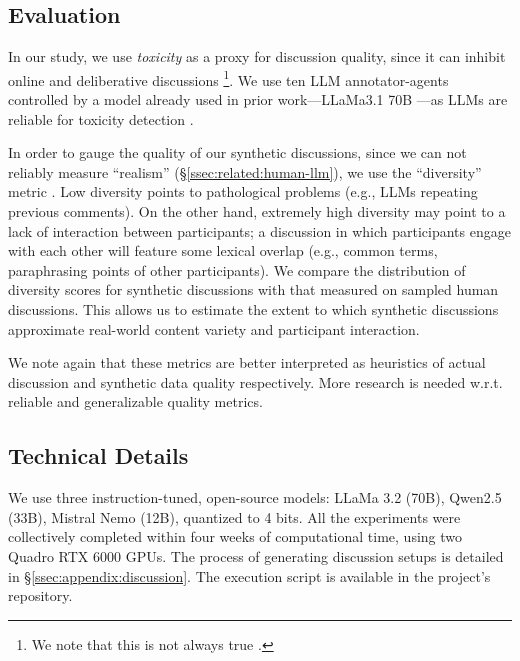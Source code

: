 \subsection{Evaluation}
\label{ssec:experimental:evaluation}

In our study, we use \emph{toxicity} as a proxy for discussion quality, since it can inhibit online and deliberative discussions \citep{dekock2022disagree, XiaToxicity}\footnote{We note that this is not always true \citep{Avalle2024PersistentIP}.}. We use ten LLM annotator-agents controlled by a model already used in prior work---LLaMa3.1 70B \citep{kang-qian-2024-implanting}---as LLMs are reliable for toxicity detection \citep{kang-qian-2024-implanting, Wang2022ToxicityDW, anjum2024hate}.

In order to gauge the quality of our synthetic discussions, since we can not reliably measure ``realism'' (\S\ref{ssec:related:human-llm}), we use the ``diversity'' metric \citep{ulmer2024}. Low diversity points to pathological problems (e.g., LLMs repeating previous comments). On the other hand, extremely high diversity may point to a lack of interaction between participants; a discussion in which participants engage with each other will feature some lexical overlap (e.g., common terms, paraphrasing points of other participants). We compare the distribution of diversity scores for synthetic discussions with that measured on sampled human discussions. This allows us to estimate the extent to which synthetic discussions approximate real-world content variety and participant interaction. 

We note again that these metrics are better interpreted as heuristics of actual discussion and synthetic data quality respectively. More research is needed w.r.t. reliable and generalizable quality metrics.


\subsection{Technical Details}
\label{ssec:experimental:setup}

We use three instruction-tuned, open-source models: LLaMa 3.2 (70B), Qwen2.5 (33B),  Mistral Nemo (12B), quantized to 4 bits. All the experiments were collectively completed within four weeks of computational time, using two Quadro RTX 6000 GPUs. The process of generating discussion setups is detailed in \S\ref{ssec:appendix:discussion}. The execution script is available in the project's repository.\analysislink 